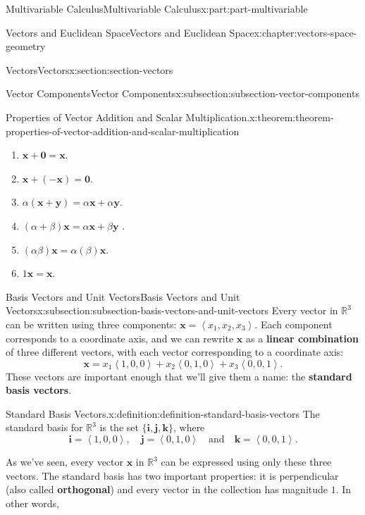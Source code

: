 \documentclass[twoside,10pt,]{book}
\newcommand{\terminology}[1]{\textbf{#1}}
\numberwithin{equation}{part}
\newcommand{\RR}{\mathbb{R}}
\newcommand{\dotprod}[1]{\left\langle #1 \right\rangle}
\begin{document}
\begin{partptx}{Multivariable Calculus}{}{Multivariable Calculus}{}{}{x:part:part-multivariable}
\begin{chapterptx}{Vectors and Euclidean Space}{}{Vectors and Euclidean Space}{}{}{x:chapter:vectors-space-geometry}
\begin{sectionptx}{Vectors}{}{Vectors}{}{}{x:section:section-vectors}
\begin{subsectionptx}{Vector Components}{}{Vector Components}{}{}{x:subsection:subsection-vector-components}
\begin{theorem}{Properties of Vector Addition and Scalar Multiplication.}{}{x:theorem:theorem-properties-of-vector-addition-and-scalar-multiplication}
\begin{multicols}{2}
\begin{enumerate}
\item{}\(\displaystyle \mathbf{x}+\mathbf{0} = \mathbf{x}.\)%
\item{}\(\displaystyle \mathbf{x}+(-\mathbf{x}) = \mathbf{0}.\)%
\item{}\(\displaystyle \alpha(\mathbf{x}+\mathbf{y}) = \alpha\mathbf{x}+\alpha\mathbf{y}.\)%
\item{}\(\displaystyle (\alpha+\beta)\mathbf{x} = \alpha\mathbf{x}+\beta\mathbf{y}\)%
. \item{}\(\displaystyle (\alpha\beta)\mathbf{x} = \alpha(\beta)\mathbf{x}.\)%
\item{}\(\displaystyle 1\mathbf{x} = \mathbf{x}.\)%
\end{enumerate}
\end{multicols}
\end{theorem}
\end{subsectionptx}
%
%
\typeout{************************************************}
\typeout{************************************************}
%
\begin{subsectionptx}{Basis Vectors and Unit Vectors}{}{Basis Vectors and Unit Vectors}{}{}{x:subsection:subsection-basis-vectors-and-unit-vectors}
Every vector in \(\RR^{3}\) can be written using three components: \(\mathbf{x} = \dotprod{x_{1},x_{2},x_{3}}.\) Each component corresponds to a coordinate axis, and we can rewrite \(\mathbf{x}\) as a \terminology{linear combination} of three different vectors, with each vector corresponding to a coordinate axis:%
%
\begin{equation*}
\mathbf{x} = x_{1}\dotprod{1,0,0}+x_{2}\dotprod{0,1,0}+x_{3}\dotprod{0,0,1}.
\end{equation*}
These vectors are important enough that we'll give them a name: the \terminology{standard basis vectors}. \begin{definition}{Standard Basis Vectors.}{x:definition:definition-standard-basis-vectors}%
%
The standard basis for \(\RR^{3}\) is the set \(\{\mathbf{i},\mathbf{j},\mathbf{k}\}\), where%
%
\begin{equation*}
\mathbf{i} = \dotprod{1,0,0},\quad\mathbf{j} = \dotprod{0,1,0}\quad\text{and}\quad\mathbf{k} = \dotprod{0,0,1}.
\end{equation*}
\end{definition}
As we've seen, every vector \(\mathbf{x}\) in \(\RR^{3}\) can be expressed using only these three vectors. The standard basis has two important properties: it is perpendicular (also called \terminology{orthogonal}) and every vector in the collection has magnitude \(1\). In other words,%

\end{subsectionptx}
\end{sectionptx}
\end{chapterptx}
\end{partptx}
\end{document}
